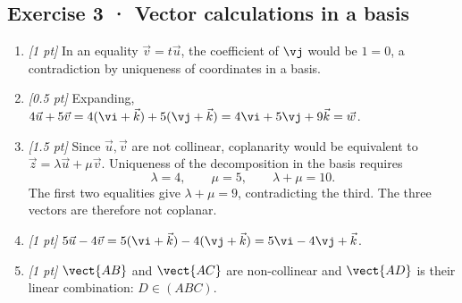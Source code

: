 \subsection*{Exercise 3 · Vector calculations in a basis}\begin{enumerate}

\item \textit{[1 pt]} In an equality $\vec v=t\vec u$, the coefficient of $\vj $ would be $1=0$, a contradiction by uniqueness of coordinates in a basis.

\item \textit{[0.5 pt]} Expanding, $4\vec u+5\vec v=4(\vi +\vec k)+5(\vj +\vec k)=4\vi +5\vj +9\vec k=\vec w$.

\item \textit{[1.5 pt]} Since $\vec u,\vec v$ are not collinear, coplanarity would be equivalent to $\vec z=\lambda\vec u+\mu\vec v$. Uniqueness of the decomposition in the basis requires
\[\lambda=4,\qquad\mu=5,\qquad\lambda+\mu=10.\]
The first two equalities give $\lambda+\mu=9$, contradicting the third. The three vectors are therefore not coplanar.

\item \textit{[1 pt]} $5\vec u-4\vec v=5(\vi +\vec k)-4(\vj +\vec k)=5\vi -4\vj +\vec k$.

\item \textit{[1 pt]} $\vect{AB}$ and $\vect{AC}$ are non-collinear and $\vect{AD}$ is their linear combination: $D\in(ABC)$.

\end{enumerate}


